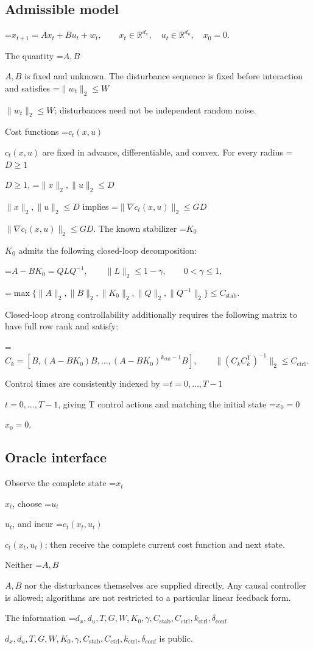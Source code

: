 \documentclass[10pt,a4paper]{article}
\newcommand{\AtlasMath}[1]{\par\begingroup\centering\setbox0=\hbox{$\displaystyle #1$}\ifdim\wd0>1.4\linewidth\typeout{ATLAS WIDE FORMULA: \the\wd0}\fi\ifdim\wd0>\linewidth\resizebox{\linewidth}{!}{\box0}\else\box0\fi\par\endgroup}
\newcommand{\AtlasInlineMath}[1]{\begingroup\setbox0=\hbox{$#1$}\ifdim\wd0>.4\linewidth\endgroup\AtlasMath{#1}\else\endgroup$#1$\fi}
\begin{document}
\subsection{Admissible model}

\AtlasMath{x_{t+1}=Ax_t+Bu_t+w_t,\qquad x_t\in\mathbb{R}^{d_x},\quad u_t\in\mathbb{R}^{d_u},\quad x_0=0.}


The quantity \AtlasInlineMath{A,B} is fixed and unknown. The disturbance sequence is fixed before interaction and satisfies \AtlasInlineMath{\|w_t\|_2\le W}; disturbances need not be independent random noise.

Cost functions \AtlasInlineMath{c_t(x,u)} are fixed in advance, differentiable, and convex. For every radius \AtlasInlineMath{D\ge1}, \AtlasInlineMath{\|x\|_2,\|u\|_2\le D} implies \AtlasInlineMath{\|\nabla c_t(x,u)\|_2\le GD}. The known stabilizer \AtlasInlineMath{K_0} admits the following closed-loop decomposition:


\AtlasMath{A-BK_0=QLQ^{-1},\qquad \|L\|_2\le1-\gamma,\qquad 0<\gamma\le1,}



\AtlasMath{\max\{\|A\|_2,\|B\|_2,\|K_0\|_2,\|Q\|_2,\|Q^{-1}\|_2\}\le C_{\mathrm{stab}}.}


Closed-loop strong controllability additionally requires the following matrix to have full row rank and satisfy:


\AtlasMath{C_k=[B,(A-BK_0)B,\ldots,(A-BK_0)^{k_{\mathrm{ctrl}}-1}B],\qquad \|(C_kC_k^{\mathsf T})^{-1}\|_2\le C_{\mathrm{ctrl}}.}


Control times are consistently indexed by \AtlasInlineMath{t=0,\ldots,T-1}, giving T control actions and matching the initial state \AtlasInlineMath{x_0=0}.

\subsection{Oracle interface}
Observe the complete state \AtlasInlineMath{x_t}, choose \AtlasInlineMath{u_t}, and incur \AtlasInlineMath{c_t(x_t,u_t)}; then receive the complete current cost function and next state.

Neither \AtlasInlineMath{A,B} nor the disturbances themselves are supplied directly. Any causal controller is allowed; algorithms are not restricted to a particular linear feedback form.

The information \AtlasInlineMath{d_x,d_u,T,G,W,K_0,\gamma,C_{\mathrm{stab}},C_{\mathrm{ctrl}},k_{\mathrm{ctrl}},\delta_{\mathrm{conf}}} is public.
\end{document}
